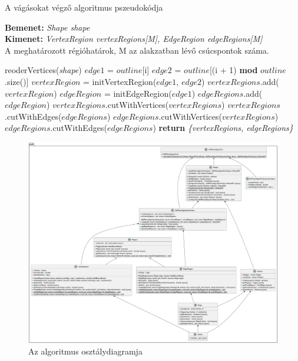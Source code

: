 \begin{algorithm}[H]
    \caption{A vágásokat végző algoritmus pszeudokódja}
    \label{alg:algorithm}
    \textbf{Bemenet:} \textit{Shape shape} \\
    \textbf{Kimenet:} \textit{VertexRegion vertexRegions[M], EdgeRegion edgeRegions[M]}\\A meghatározott régióhatárok, M az alakzatban lévő csúcspontok száma.
    \begin{algorithmic}[1]
        \State reoderVertices(\textit{shape})
                \State $edge1$ = $outline$[i]
                \State $edge2$ = $outline$[(i + 1) \textbf{mod} $outline$.size()]
                \State $vertexRegion$ = initVertexRegion($edge1$, $edge2$)
                \State $vertexRegions$.add($vertexRegion$)
                \State $edgeRegion$ = initEdgeRegion($edge1$)
                \State $edgeRegions$.add($edgeRegion$)
            \EndFor
        \EndFor
        \State $vertexRegions$.cutWithVertices($vertexRegions$)
        \State $vertexRegions$.cutWithEdges($edgeRegions$)
        \State $edgeRegions$.cutWithVertices($vertexRegions$)
        \State $edgeRegions$.cutWithEdges($edgeRegions$)
        \State \textbf{return} \textit{\{vertexRegions, edgeRegions\}}
    \end{algorithmic}
\end{algorithm}

\begin{figure}[H]
    \centering
    \includegraphics[width=1\linewidth]{images/class_algorithm.png}
    \caption{Az algoritmus osztálydiagramja}
    \label{fig:class_algorithm-1}
\end{figure}

